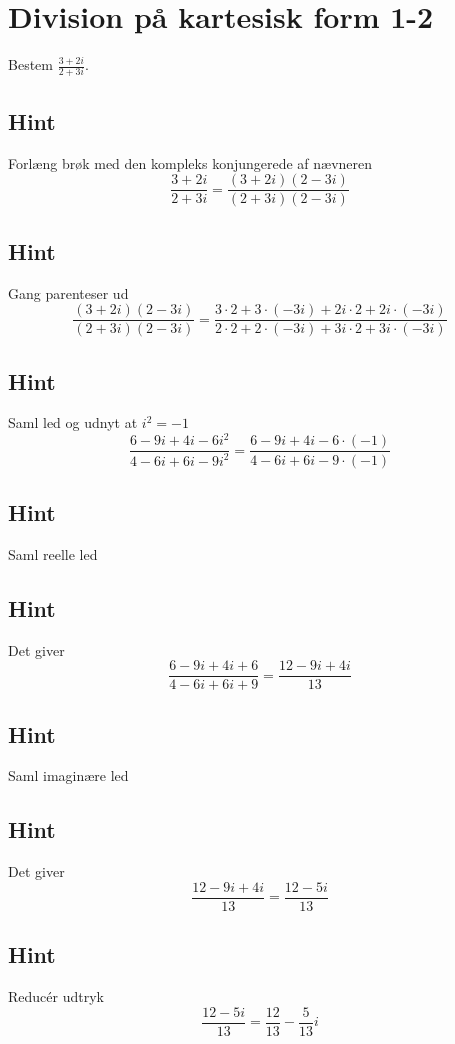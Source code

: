 \documentclass{article}
\newenvironment{exercise}[1]{\newpage\section{#1}}{}
\newcommand{\answerbox}[1]{\fbox{$#1$}}
\newcommand{\hint}{\subsection*{Hint}}
\begin{document}
\begin{exercise}{Division på kartesisk form 1-2}
	
	Bestem $\frac{3+2i}{2+3i}$.
	
	\answerbox{\frac{12}{13} - \frac{5}{13}i}
	
	
	\hint 
	
	Forlæng brøk med den kompleks konjungerede af nævneren
	\[
	\frac{3+2i}{2+3i} = \frac{(3+2i)(2-3i)}{(2+3i)(2-3i)}
	\]
	
	\hint
	
	Gang parenteser ud
	\[
	\frac{(3+2i)(2-3i)}{(2+3i)(2-3i)} = \frac{3 \cdot 2 + 3 \cdot (-3i) + 2i \cdot 2 + 2i \cdot (-3i)}{2 \cdot 2 + 2\cdot (-3i) + 3i \cdot 2 + 3i \cdot (-3i)}
	\]
	
	\hint 
	
	Saml led og udnyt at $i^2 = -1$
	\[
	\frac{6 -9i +4i-6i^2}{4 - 6i + 6i -9i^2} = 	\frac{6 -9i +4i-6 \cdot (-1)}{4 - 6i + 6i -9 \cdot (-1)}
	\]
	
	\hint
	
	Saml reelle led
	
	\hint
	
	Det giver
	\[
	\frac{6 -9i +4i+6}{4 - 6i + 6i +9} = \frac{12 - 9i +4i}{13}
	\]
	
	\hint
	
	Saml imaginære led
	
	
	\hint
	
	Det giver 
	\[
	\frac{12 - 9i +4i}{13} = \frac{12 -5i}{13}
	\]
	
	\hint
	
	Reducér udtryk
	\[
	 \frac{12 -5i}{13} = \frac{12}{13} - \frac{5}{13}i
	\]
	
\end{exercise}

\newpage
\end{document}
